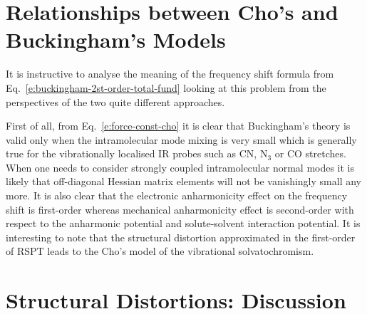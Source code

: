 \documentclass[b5paper,oneside,fleqn,11pt]{book}
\begin{document}
\begin{refsection}
\section{Relationships between Cho's and Buckingham's Models}

It is instructive to analyse the meaning of the frequency shift
formula from Eq.~\eqref{e:buckingham-2st-order-total-fund}
looking at this problem from the perspectives of the two quite different approaches.

First of all, from Eq.~\eqref{e:force-const-cho} it is clear 
that Buckingham's theory is valid only
when the intramolecular mode mixing is very small which
is generally true for the vibrationally localised IR probes
such as CN, N$_3$ or CO stretches. When one needs to consider
strongly coupled intramolecular normal modes it is likely
that off\hyp{}diagonal Hessian matrix elements will not be vanishingly
small any more. It is also
clear that the electronic anharmonicity effect on the frequency 
shift is first\hyp{}order
whereas mechanical anharmonicity effect is second\hyp{}order 
with respect to the anharmonic potential and solute\hyp{}solvent
interaction potential. It is interesting to note 
that the structural distortion approximated
in the first\hyp{}order of RSPT leads to the Cho's model of the vibrational
solvatochromism. 

\section{Structural Distortions: Discussion \label{s:str-dist-general-discussion}}


\end{refsection}
\end{document}
